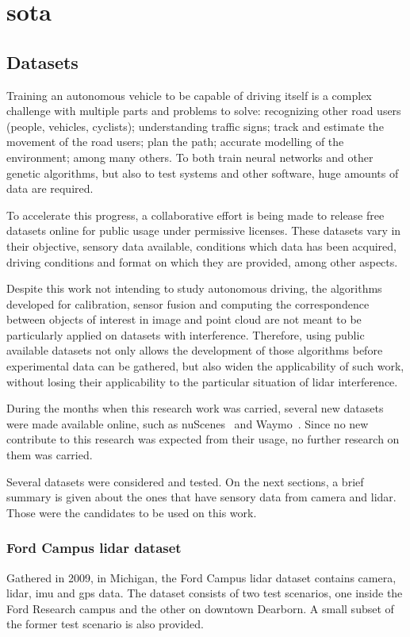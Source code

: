 \chapter{\acl{sota}}
\label{chapter:sota}

\section{Datasets}
\label{section:sota:datasets}

Training an autonomous vehicle to be capable of driving itself is a complex challenge with multiple parts and problems to solve: recognizing other road users (people, vehicles, cyclists); understanding traffic signs; track and estimate the movement of the road users; plan the path; accurate modelling of the environment; among many others. To both train neural networks and other genetic algorithms, but also to test systems and other software, huge amounts of data are required.

To accelerate this progress, a collaborative effort is being made to release free datasets online for public usage under permissive licenses. These datasets vary in their objective, sensory data available, conditions which data has been acquired, driving conditions and format on which they are provided, among other aspects. 

Despite this work not intending to study autonomous driving, the algorithms developed for calibration, sensor fusion and computing the correspondence between objects of interest in image and point cloud are not meant to be particularly applied on datasets with interference. Therefore, using public available datasets not only allows the development of those algorithms before experimental data can be gathered, but also widen the applicability of such work, without losing their applicability to the particular situation of \ac{lidar} interference.

During the months when this research work was carried, several new datasets were made available online, such as nuScenes~\cite{nuScenes2019} and Waymo~\cite{Waymo}. Since no new contribute to this research was expected from their usage, no further research on them was carried. 

Several datasets were considered and tested. On the next sections, a brief summary is given about the ones that have sensory data from camera and \ac{lidar}. Those were the candidates to be used on this work.

\subsection{Ford Campus \acl{lidar} dataset}
Gathered in 2009, in Michigan, the Ford Campus \ac{lidar} dataset contains camera, \ac{lidar}, \ac{imu} and \ac{gps} data. The dataset consists of two test scenarios, one inside the Ford Research campus and the other on downtown Dearborn. A small subset of the former test scenario is also provided.

